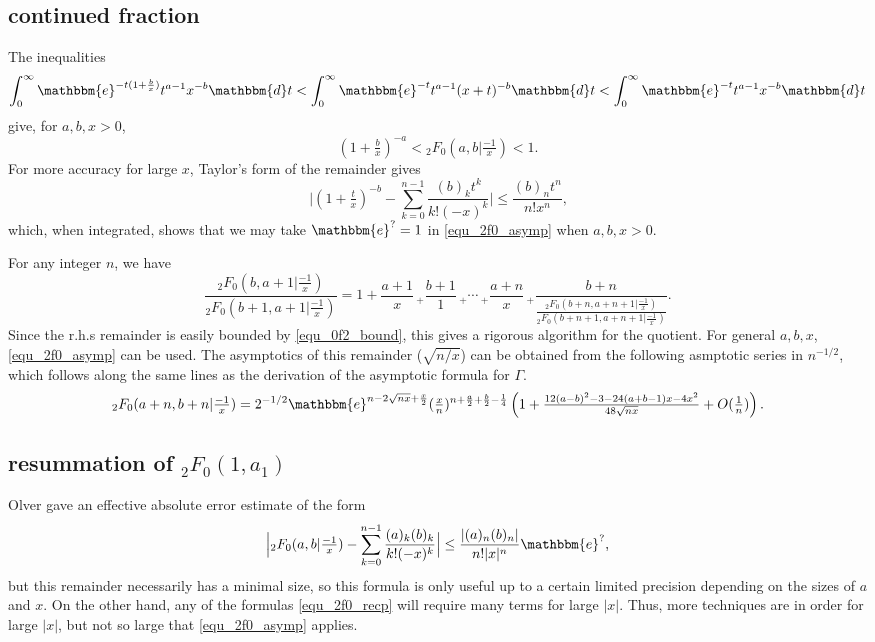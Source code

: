 \documentclass[12pt]{article}
\newcommand{\ee}[0] {\mathbbm{e}}
\newcommand{\dd}[0] {\mathbbm{d}}
\numberwithin{equation}{section}
\begin{document}
\subsection{continued fraction}
The inequalities
\begin{equation*}
\int_{0}^{\infty} \ee^{-t(1+\frac{b}{x})} t^{a-1}x^{-b} \dd t < \int_{0}^{\infty} \ee^{-t} t^{a-1}(x+t)^{-b} \dd t < \int_{0}^{\infty} \ee^{-t} t^{a-1}x^{-b} \dd t
\end{equation*}
give, for $a,b,x>0$,
\begin{equation}
\label{equ_0f2_bound}
(1+\tfrac{b}{x})^{-a} < {}_2 F_0(a,b|\tfrac{-1}{x}) < 1\text{.}
\end{equation}
For more accuracy for large $x$, Taylor's form of the remainder gives
\begin{equation*}
\Big| (1+\tfrac{t}{x})^{-b} - \sum_{k=0}^{n-1} \frac{(b)_k t^k}{ k! (-x)^k} \Big| \le \frac{(b)_n t^n}{ n!x^n} \text{,}
\end{equation*}
which, when integrated, shows that we may take $\ee^{?} = 1$ in \eqref{equ_2f0_asymp} when $a,b,x>0$.

For any integer $n$, we have
\begin{equation}
\label{equ_2f0_cf}
\frac{{}_2 F_0(b,a+1|\tfrac{-1}{x})}{{}_2 F_0(b+1,a+1|\tfrac{-1}{x})} = 1+\frac{a+1}{x} \,_{+} \frac{b+1}{1}  \,_{+} \cdots \,_{+} \frac{a+n}{x} \,_{+} \frac{b+n}{\frac{{}_2 F_0(b+n,a+n+1|\tfrac{-1}{x})}{{}_2 F_0(b+n+1,a+n+1|\tfrac{-1}{x})}}\text{.}
\end{equation}
Since the r.h.s remainder is easily bounded by \eqref{equ_0f2_bound}, this gives a rigorous algorithm for the quotient. For general $a,b,x$, \eqref{equ_2f0_asymp} can be used. The asymptotics of this remainder ($\sqrt{n/x}$) can be obtained from the following asmptotic series in $n^{-1/2}$, which follows along the same lines as the derivation of the asymptotic formula for $\Gamma$.
\begin{equation*}
{}_2 F_0(a+n,b+n|\tfrac{-1}{x}) = 2^{-1/2} \ee^{n-2\sqrt{n x} + \frac{x}{2}} (\tfrac{x}{n})^{n+\frac{a}{2}+\frac{b}{2}-\frac{1}{4}} \left(1 + \tfrac{12(a-b)^2-3-24(a+b-1)x-4 x^2}{48\sqrt{n x}} + O(\tfrac{1}{n}) \right)\text{.}
\end{equation*}


\subsection{resummation of ${}_2 F_0(1,a_1)$}
Olver gave an effective absolute error estimate of the form
\begin{equation}
\label{equ_2f0_asymp}
\Big| {}_2 F_0(a,b|\tfrac{-1}{x}) - \sum_{k=0}^{n-1} \frac{(a)_k (b)_k}{ k! (-x)^k} \Big| \le \frac{|(a)_n (b)_n|}{ n! |x|^n} \ee^{?}\text{,}
\end{equation}
but this remainder necessarily has a minimal size, so this formula is only useful up to a certain limited precision depending on the sizes of $a$ and $x$. On the other hand, any of the formulas \eqref{equ_2f0_recp} will require many terms for large $|x|$. Thus, more techniques are in order for large $|x|$, but not so large that \eqref{equ_2f0_asymp} applies.
\end{document}
